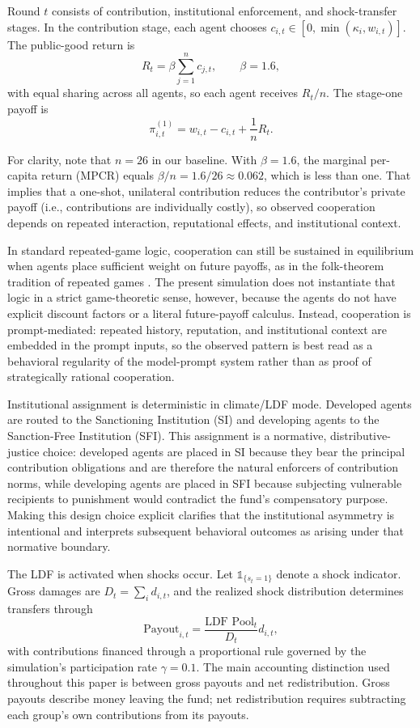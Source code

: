 \documentclass[12pt,letterpaper]{article}
\begin{document}
Round $t$ consists of contribution, institutional enforcement, and shock-transfer stages. In the contribution stage, each agent chooses $c_{i,t} \in [0,\min(\kappa_i,w_{i,t})]$. The public-good return is
\[
R_t = \beta \sum_{j=1}^{n} c_{j,t}, \qquad \beta = 1.6,
\]
with equal sharing across all agents, so each agent receives $R_t/n$. The stage-one payoff is
\[
\pi_{i,t}^{(1)} = w_{i,t} - c_{i,t} + \frac{1}{n} R_t.
\]

For clarity, note that $n=26$ in our baseline. With $\beta=1.6$, the marginal per-capita return (MPCR) equals $\beta/n = 1.6/26 \approx 0.062$, which is less than one. That implies that a one-shot, unilateral contribution reduces the contributor's private payoff (i.e., contributions are individually costly), so observed cooperation depends on repeated interaction, reputational effects, and institutional context.

In standard repeated-game logic, cooperation can still be sustained in equilibrium when agents place sufficient weight on future payoffs, as in the folk-theorem tradition of repeated games \citep{friedman1971,fudenbergmaskin1986}. The present simulation does not instantiate that logic in a strict game-theoretic sense, however, because the agents do not have explicit discount factors or a literal future-payoff calculus. Instead, cooperation is prompt-mediated: repeated history, reputation, and institutional context are embedded in the prompt inputs, so the observed pattern is best read as a behavioral regularity of the model-prompt system rather than as proof of strategically rational cooperation.

Institutional assignment is deterministic in climate/LDF mode. Developed agents are routed to the Sanctioning Institution (SI) and developing agents to the Sanction-Free Institution (SFI). This assignment is a normative, distributive-justice choice: developed agents are placed in SI because they bear the principal contribution obligations and are therefore the natural enforcers of contribution norms, while developing agents are placed in SFI because subjecting vulnerable recipients to punishment would contradict the fund's compensatory purpose. Making this design choice explicit clarifies that the institutional asymmetry is intentional and interprets subsequent behavioral outcomes as arising under that normative boundary.

The LDF is activated when shocks occur. Let $\mathbb{1}_{\{s_t=1\}}$ denote a shock indicator. Gross damages are $D_t = \sum_i d_{i,t}$, and the realized shock distribution determines transfers through
\[
\text{Payout}_{i,t} = \frac{\text{LDF Pool}_t}{D_t} d_{i,t},
\]
with contributions financed through a proportional rule governed by the simulation's participation rate $\gamma=0.1$. The main accounting distinction used throughout this paper is between gross payouts and net redistribution. Gross payouts describe money leaving the fund; net redistribution requires subtracting each group's own contributions from its payouts.
\end{document}
